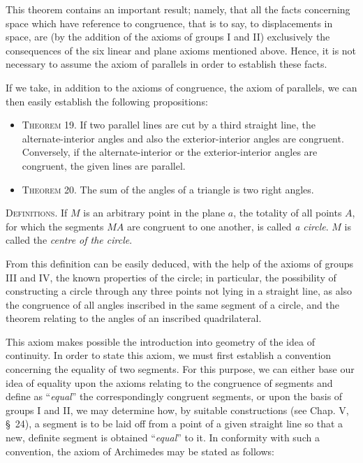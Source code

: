 \documentclass[11pt,oneside]{book}
\begin{document}
This theorem contains an important result; namely,
that all the facts concerning space which have reference
to congruence, that is to say, to displacements
in space, are (by the addition of the axioms of groups
I and II) exclusively the consequences of the six
linear and plane axioms mentioned above. Hence, it
is not necessary to assume the axiom of parallels in
order to establish these facts.

If we take, in addition to the axioms of congruence,
the axiom of parallels, we can then easily establish
the following propositions:

\begin{itemize}
\item[]{\scshape Theorem 19.} If two parallel lines are cut by a
third straight line, the alternate-interior angles
and also the exterior-interior angles are congruent.
\label{folio26}
Conversely, if the alternate-interior or
the exterior-interior angles are congruent, the
given lines are parallel.

\item[]{\scshape Theorem 20.} The sum of the angles of a triangle
is two right angles.
\end{itemize}

{\scshape Definitions.} If $M$ is an arbitrary point in the
plane $a$, the totality of all points $A$, for which the segments
$MA$ are congruent to one another, is called \emph{a
circle}. $M$ is called the \emph{centre of the circle}.

From this definition can be easily deduced, with
the help of the axioms of groups III and IV, the
known properties of the circle; in particular, the possibility
of constructing a circle through any three
points not lying in a straight line, as also the congruence
of all angles inscribed in the same segment of
a circle, and the theorem relating to the angles of an
inscribed quadrilateral.

\label{p8}

This axiom makes possible the introduction into
geometry of the idea of continuity. In order to state
this axiom, we must first establish a convention concerning
the equality of two segments. For this purpose,
we can either base our idea of equality upon the
axioms relating to the congruence of segments and
define as ``\emph{equal}'' the correspondingly congruent segments,
or upon the basis of groups I and II, we may
determine how, by suitable constructions (see Chap.
V, \S~24), a segment is to be laid off from a point of a
given straight line so that a new, definite segment is
obtained ``\emph{equal}'' to it. In conformity with such a
\label{folio27}
convention, the axiom of Archimedes may be stated
as follows:
\end{document}
